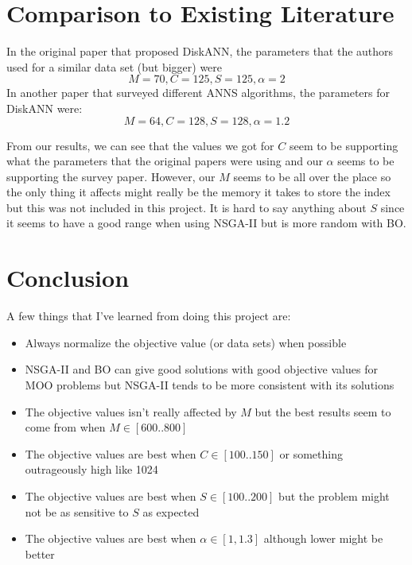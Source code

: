 \section{Comparison to Existing Literature}

In the original paper that proposed DiskANN, the parameters that the authors used for a similar data set (but bigger) were
\[
    M=70, C=125, S=125, \alpha=2
\]
In another paper that surveyed different ANNS algorithms, the parameters for DiskANN were:
\[
    M=64, C=128, S=128, \alpha=1.2
\]

From our results, we can see that the values we got for \(C\) seem to be supporting what the parameters that the original papers were using and our \(\alpha\) seems to be supporting the survey paper. However, our \(M\) seems to be all over the place so the only thing it affects might really be the memory it takes to store the index but this was not included in this project. It is hard to say anything about \(S\) since it seems to have a good range when using NSGA-II but is more random with BO.

\section{Conclusion}

A few things that I've learned from doing this project are:
\begin{itemize}
    \item Always normalize the objective value (or data sets) when possible
    \item NSGA-II and BO can give good solutions with good objective values for MOO problems but NSGA-II tends to be more consistent with its solutions
    \item The objective values isn't really affected by \(M\) but the best results seem to come from when \(M \in [600..800]\)
    \item The objective values are best when \(C \in [100..150]\) or something outrageously high like 1024
    \item The objective values are best when \(S \in [100..200]\) but the problem might not be as sensitive to \(S\) as expected
    \item The objective values are best when \(\alpha \in [1, 1.3]\) although lower might be better
\end{itemize}
